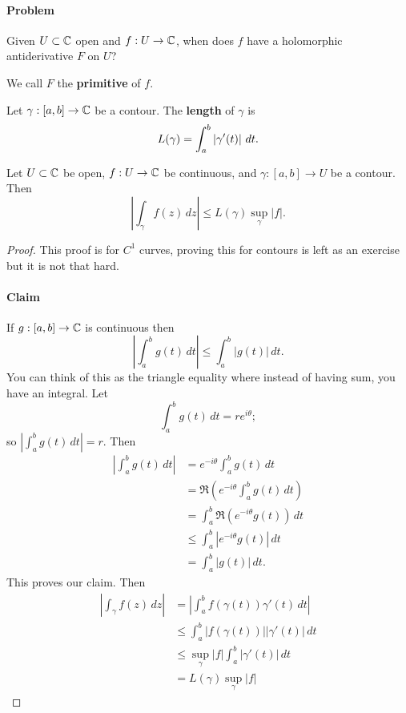 
\paragraph{Problem}
Given $U \subset \mathbb{C}$ open and $f: U \to \mathbb{C}$,
when does $f$ have a holomorphic antiderivative $F$ on $U$?

We call $F$ the \textbf{primitive} of $f$.

\begin{definition}
    Let $\gamma: [a, b] \to \mathbb{C}$ be a contour.
    The \textbf{length} of $\gamma$ is
    \[ 
        L(\gamma) = \int_a^b \left\lvert\gamma'(t)\right\rvert \, dt. 
    \]
\end{definition}

\begin{lemma}
    Let $U \subset \mathbb{C}$ be open,
    $f: U \to \mathbb{C}$ be continuous, and
    $\gamma: [a, b] \to U$ be a contour.
    Then
    \[
        \left\lvert
            \int_\gamma f(z) \,dz
        \right\rvert
        \leq L(\gamma) \sup_\gamma \lvert f \rvert.
    \]
\end{lemma}

\begin{proof}
    This proof is for $C^1$ curves,
    proving this for contours is left as an exercise %
    but it is not that hard.
    
    \paragraph{Claim}
    If $g: [a, b] \to \mathbb{C}$ is continuous then
    \[
        \left\lvert
            \int_a^b g(t) \,dt
        \right\rvert
        \leq \int_a^b \lvert g(t) \rvert \, dt.
    \]
    You can think of this as the triangle equality where instead
    of having sum, you have an integral.
    Let
    \[
        \int_a^b g(t) \,dt = re^{i\theta};
    \]
    so $\left\lvert\int_a^b g(t) \,dt \right\rvert = r$.
    Then
    \begin{align*}
        \left\lvert\int_a^b g(t) \,dt \right\rvert
        &=    e^{-i\theta} \int_a^b g(t) \,dt \\
        &=    \Re\left(e^{-i\theta}\int_a^bg(t)\,dt\right) \\
        &=    \int_a^b \Re\left(e^{-i\theta} g(t)\right) \,dt \\
        &\leq \int_a^b \left\lvert e^{-i\theta} g(t) \right\rvert \,dt \\
        &=    \int_a^b \left\lvert g(t) \right\rvert \,dt.
    \end{align*}
    This proves our claim.
    Then
    \begin{align*}
        \left\lvert \int_\gamma f(z)\,dz \right\rvert
        &=    \left\lvert \int_a^b f(\gamma(t)) \gamma'(t) \,dt \right\rvert \\
        &\leq \int_a^b \lvert f(\gamma(t)) \rvert \lvert \gamma'(t) \rvert \,dt \\
        &\leq \sup_\gamma \lvert f \rvert \int_a^b \lvert \gamma'(t) \rvert \,dt \\
        &=    L(\gamma) \sup_\gamma \lvert f \rvert
    \end{align*}
\end{proof}


